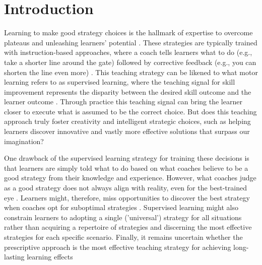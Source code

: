 \documentclass{article}
\begin{document}
\begin{abstract}
    
\end{abstract}






\section{Introduction}

Learning to make good strategy choices is the hallmark of expertise to overcome plateaus and unleashing learners' potential  \cite{wolpert_principles_2011, krakauer_motor_2019, mangalam_investigating_2023, du_relationship_2022, gallivan_decision-making_2018}. These strategies are typically trained with instruction-based approaches, where a coach tells learners what to do (e.g., take a shorter line around the gate) followed by corrective feedback (e.g., you can shorten the line even more) \cite{williams_practice_2005, williams_effective_2023, hodges_role_1999}. This teaching strategy can be likened to what motor learning refers to as supervised learning, where the teaching signal for skill improvement represents the disparity between the desired skill outcome and the learner outcome \cite{jordan_forward_1992, wolpert_motor_2010, doya_complementary_2000}. Through practice this teaching signal can bring the learner closer to execute what is assumed to be the correct choice. But does this teaching approach truly foster creativity and intelligent strategic choices, such as helping learners discover innovative and vastly more effective solutions that surpass our imagination?

One drawback of the supervised learning strategy for training these decisions is that learners are simply told what to do based on what coaches believe to be a good strategy from their knowledge and experience. However, what coaches judge as a good strategy does not always align with reality, even for the best-trained eye \cite{supej_impact_2019, cochrum_visual_2021}. Learners might, therefore, miss opportunities to discover the best strategy when coaches opt for suboptimal strategies \cite{gray_plateaus_2017}. Supervised learning might also constrain learners to adopting a single ('universal') strategy for all situations rather than acquiring a repertoire of strategies and discerning the most effective strategies for each specific scenario. Finally, it remains uncertain whether the prescriptive approach is the most effective teaching strategy for achieving long-lasting learning effects \cite{wulf_instructions_1997} 
\end{document}

